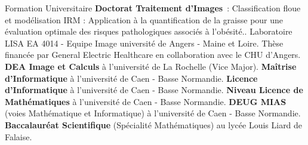 

\begin{rubric}{Formation Universitaire}
  \entry*[2004--2008]%
  \textbf{Doctorat Traitement d'Images}~: \og Classification floue et modélisation IRM : Application à la quantification de la graisse pour une évaluation optimale des risques pathologiques associés à l'obésité.\fg. Laboratoire \textsc{LISA EA 4014} - Equipe Image
  université de Angers - Maine et Loire. Thèse financée par General Electric Healthcare en collaboration avec le CHU d'Angers.
  \entry*[2003--2004]%
  \textbf{DEA Image et Calculs} à l'université de La Rochelle (Vice Major).
  \entry*[2001--2003]%
  \textbf{Maîtrise d'Informatique} à l'université de Caen - Basse Normandie. 
  \entry*[2000--2001]%
  \textbf{Licence d'Informatique} à l'université de Caen - Basse Normandie. 
  \entry*[1998-2000]%
  \textbf{Niveau Licence de Mathématiques} à l'université de Caen - Basse Normandie.
  \entry*[1996-1998]%
  \textbf{DEUG MIAS} (voies Mathématique et Informatique) à l'université de Caen - Basse Normandie.
  \entry*[1996]%
  \textbf{Baccalauréat Scientifique} (Spécialité Mathématiques) au lycée Louis Liard de Falaise.
\end{rubric}


%
